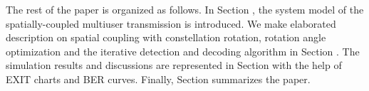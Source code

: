 \documentclass[conference]{IEEEtran}
\begin{document}
The rest of the paper is organized as follows. In Section \uppercase\expandafter{}, the system model of the spatially-coupled multiuser transmission is introduced. We make elaborated description on spatial coupling with constellation rotation, rotation angle optimization and the iterative detection and decoding algorithm in Section \uppercase\expandafter{}. The simulation results and discussions are represented in Section \uppercase\expandafter{} with the help of EXIT charts and BER curves. Finally, Section \uppercase\expandafter{} summarizes the paper.








%
%

\end{document}

